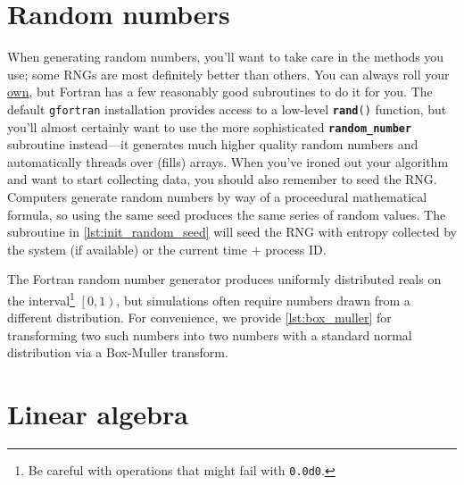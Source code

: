 \documentclass[openany,oneside]{report}
\newcommand{\keyword}[1]{\texttt{\bfseries\color{DarkBlue}#1}}
\begin{document}
\chapter{Random numbers}
\label{chap:Random numbers}
When generating random numbers, you'll want to take care in the methods you use; some RNGs are most definitely better than others.
You can always roll your \href{http://xkcd.com/221/}{own}, but Fortran has a few reasonably good subroutines to do it for you.
The default \texttt{gfortran} installation provides access to a low-level \texttt{\keyword{rand}()} function, but you'll almost certainly want to use the more sophisticated \keyword{random\_number} subroutine instead---it generates much higher quality random numbers and automatically threads over (fills) arrays.
When you've ironed out your algorithm and want to start collecting data, you should also remember to seed the RNG.
Computers generate random numbers by way of a proceedural mathematical formula, so using the same seed produces the same series of random values.
The subroutine in \autoref{lst:init_random_seed} will seed the RNG with entropy collected by the system (if available) or the current time $+$ process ID.


The Fortran random number generator produces uniformly distributed reals on the interval\footnote{Be careful with operations that might fail with \texttt{0.0d0}.} $\left[0, 1\right)$, but simulations often require numbers drawn from a different distribution. 
For convenience, we provide \autoref{lst:box_muller} for transforming two such numbers into two numbers with a standard normal distribution via a Box-Muller transform.


\chapter{Linear algebra}
\label{chap:Linear algebra}
\end{document}
